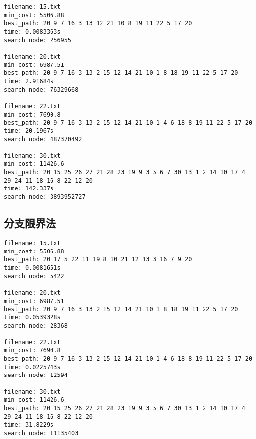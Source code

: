 \documentclass[lang=cn,11pt,a4paper]{elegantpaper}
\begin{document}
\begin{lstlisting}[language=text]
filename: 15.txt
min_cost: 5506.88
best_path: 20 9 7 16 3 13 12 21 10 8 19 11 22 5 17 20 
time: 0.0083363s
search node: 256955

filename: 20.txt
min_cost: 6987.51
best_path: 20 9 7 16 3 13 2 15 12 14 21 10 1 8 18 19 11 22 5 17 20 
time: 2.91684s
search node: 76329668

filename: 22.txt
min_cost: 7690.8
best_path: 20 9 7 16 3 13 2 15 12 14 21 10 1 4 6 18 8 19 11 22 5 17 20 
time: 20.1967s
search node: 487370492

filename: 30.txt
min_cost: 11426.6
best_path: 20 15 25 26 27 21 28 23 19 9 3 5 6 7 30 13 1 2 14 10 17 4 29 24 11 18 16 8 22 12 20 
time: 142.337s
search node: 3893952727

\end{lstlisting}

\subsection{分支限界法}
\begin{lstlisting}[language=text]
filename: 15.txt
min_cost: 5506.88
best_path: 20 17 5 22 11 19 8 10 21 12 13 3 16 7 9 20 
time: 0.0081651s
search node: 5422

filename: 20.txt
min_cost: 6987.51
best_path: 20 9 7 16 3 13 2 15 12 14 21 10 1 8 18 19 11 22 5 17 20 
time: 0.0539328s
search node: 28368

filename: 22.txt
min_cost: 7690.8
best_path: 20 9 7 16 3 13 2 15 12 14 21 10 1 4 6 18 8 19 11 22 5 17 20 
time: 0.0225743s
search node: 12594

filename: 30.txt
min_cost: 11426.6
best_path: 20 15 25 26 27 21 28 23 19 9 3 5 6 7 30 13 1 2 14 10 17 4 29 24 11 18 16 8 22 12 20 
time: 31.8229s
search node: 11135403

\end{lstlisting}
\end{document}
